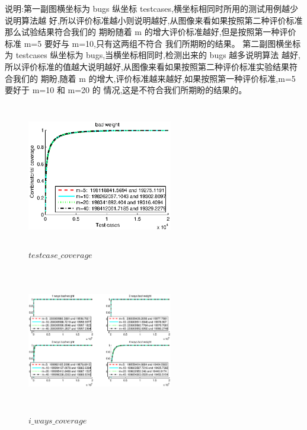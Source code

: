 \documentclass[10pt,journal,letterpaper,compsoc]{IEEEtran}
\begin{document}
\begin{CJK}{UTF8}{gkai}
说明:第一副图横坐标为 bugs 纵坐标 testcases,横坐标相同时所用的测试用例越少说明算法越
好,所以评价标准越小则说明越好,从图像来看如果按照第二种评价标准那么试验结果符合我们的
期盼随着 m 的增大评价标准越好,但是按照第一种评价标准 m=5 要好与 m=10,只有这两组不符合
我们所期盼的结果。
第二副图横坐标为 testcases 纵坐标为 bugs,当横坐标相同时,检测出来的 bugs 越多说明算法
越好,所以评价标准的值越大说明越好,从图像来看如果按照第二种评价标准实验结果符合我们的
期盼,随着 m 的增大,评价标准越来越好,如果按照第一种评价标准,m=5 要好于 m=10 和 m=20 的
情况,这是不符合我们所期盼的结果的。
 \begin{figure}[htb]
   \centering
   \includegraphics[width=2.5in,height=2.5in]{./a2_1_picture/testcase_coverage.eps}
   \caption{$testcase\_coverage$}
   \label{fig:ARCH}
 \end{figure}
 \begin{figure}[htb]
   \centering
   \includegraphics[width=2.5in,height=2.5in]{./a2_1_picture/i_ways_coverage.eps}
   \caption{$i\_ways\_coverage$}
   \label{fig:ARCH}
 \end{figure}


\end{CJK}
\end{document}
